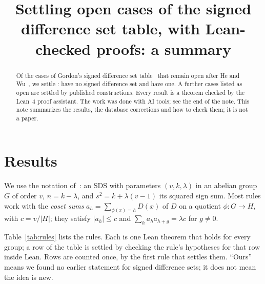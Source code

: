 \documentclass[11pt]{amsart}
\title[Open cases of the SDS table]{Settling open cases of the signed difference set table,
with Lean-checked proofs: a summary}
\author{\todo{your name}}
\date{\todo{date}}
\begin{document}
\begin{abstract}
Of the \openAfterHeWu{} cases of Gordon's signed difference set table~\cite{gordon} that
remain open after He and Wu~\cite{he-wu}, we settle \ourRows: \ourNone{} have no signed difference set and \ourExists{} have
one. A further \corrections{} cases listed as open are settled by published constructions.
Every result is a theorem checked by the Lean~4 proof assistant. The work was done with AI
tools; see the end of the note. This note summarizes the results, the database corrections and
how to check them; it is not a paper.
\end{abstract}

\maketitle

\section{Results}

We use the notation of~\cite{gordon}: an SDS with parameters $(v,k,\lambda)$ in an abelian
group $G$ of order $v$, $n = k - \lambda$, and $s^2 = k + \lambda(v-1)$ its squared sign sum.
Most rules work with the \emph{coset sums} $a_h = \sum_{\phi(x) = h} D(x)$ of $D$ on a
quotient $\phi \colon G \to H$, with $c = v/|H|$; they satisfy $|a_h| \le c$ and
$\sum_h a_h a_{h+g} = \lambda c$ for $g \neq 0$.

Table~\ref{tab:rules} lists the rules. Each is one Lean theorem that holds for every group;
a row of the table is settled by checking the rule's hypotheses for that row inside Lean.
Rows are counted once, by the first rule that settles them. ``Ours'' means we found no
earlier statement for signed difference sets; it does not mean the idea is new.
\end{document}
